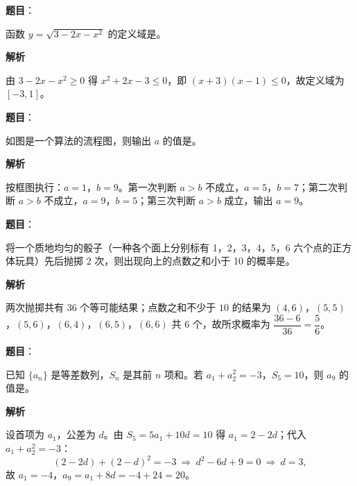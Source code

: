\begin{answer}

\textbf{题目}：

函数 \(y=\sqrt{3-2x-x^{2}}\) 的定义域是\gkblank{}。

\textbf{解析}

由 \(3-2x-x^{2}\geqslant 0\) 得 \(x^{2}+2x-3\leqslant 0\)，即 \((x+3)(x-1)\leqslant 0\)，故定义域为 \([-3,1]\)。


\end{answer}
\begin{answer}

\textbf{题目}：

如图是一个算法的流程图，则输出 \(a\) 的值是\gkblank{}。
\nopagebreak[4]
\begin{center}\end{center}
\nopagebreak[4]
\textbf{解析}

按框图执行：\(a=1\)，\(b=9\)。第一次判断 \(a>b\) 不成立，\(a=5\)，\(b=7\)；第二次判断 \(a>b\) 不成立，\(a=9\)，\(b=5\)；第三次判断 \(a>b\) 成立，输出 \(a=9\)。


\end{answer}
\begin{answer}

\textbf{题目}：

将一个质地均匀的骰子（一种各个面上分别标有 1，2，3，4，5，6 六个点的正方体玩具）先后抛掷 2 次，则出现向上的点数之和小于 10 的概率是\gkblank{}。

\textbf{解析}

两次抛掷共有 \(36\) 个等可能结果；点数之和不少于 \(10\) 的结果为 \((4,6)\)，\((5,5)\)，\((5,6)\)，\((6,4)\)，\((6,5)\)，\((6,6)\) 共 \(6\) 个，故所求概率为 \(\dfrac{36-6}{36}=\dfrac{5}{6}\)。


\end{answer}
\begin{answer}

\textbf{题目}：

已知 \(\{a_{n}\}\) 是等差数列，\(S_{n}\) 是其前 \(n\) 项和。若 \(a_{1}+a_{2}^{2}=-3\)，\(S_{5}=10\)，则 \(a_{9}\) 的值是\gkblank{}。

\textbf{解析}

设首项为 \(a_{1}\)，公差为 \(d\)。由 \(S_{5}=5a_{1}+10d=10\) 得 \(a_{1}=2-2d\)；代入 \(a_{1}+a_{2}^{2}=-3\)：
\nopagebreak[4]
\[
(2-2d)+(2-d)^{2}=-3\ \Longrightarrow\ d^{2}-6d+9=0\ \Longrightarrow\ d=3,
\]
故 \(a_{1}=-4\)，\(a_{9}=a_{1}+8d=-4+24=20\)。


\end{answer}
